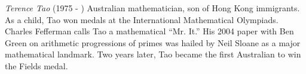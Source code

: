\documentclass[12pt]{article}
\begin{document}
\emph{Terence Tao} (1975 - ) Australian mathematician, son of Hong Kong immigrants. As a child, Tao won medals at the  International Mathematical Olympiads. Charles Fefferman calls Tao a mathematical ``Mr.  It.'' His 2004 paper with Ben Green on arithmetic progressions of primes was hailed by Neil Sloane as a major mathematical landmark. Two years later, Tao became the first Australian to win the Fields medal.
\end{document}
